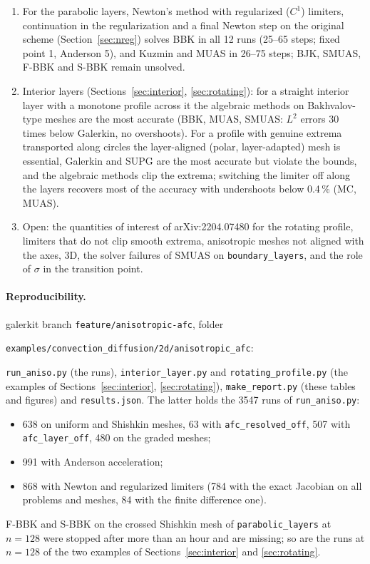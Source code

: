 \documentclass[11pt]{article}
\begin{document}
\begin{enumerate}[leftmargin=*]
  Kuzmin or MUAS.
\item For the parabolic layers, Newton's method with regularized ($C^1$) limiters, continuation in the regularization
  and a final Newton step on the original scheme (Section~\ref{sec:nreg}) solves BBK in all 12 runs (25--65 steps; fixed
  point 1, Anderson 5), and Kuzmin and MUAS in 26--75 steps; BJK, SMUAS, F-BBK and S-BBK remain unsolved.
\item Interior layers (Sections~\ref{sec:interior}, \ref{sec:rotating}): for a straight interior layer with a monotone
  profile across it the algebraic methods on Bakhvalov-type meshes are the most accurate (BBK, MUAS, SMUAS: $L^2$
  errors 30 times below Galerkin, no overshoots). For a profile with genuine extrema transported along circles the
  layer-aligned (polar, layer-adapted) mesh is essential, Galerkin and SUPG are the most accurate but violate the
  bounds, and the algebraic methods clip the extrema; switching the limiter off along the layers recovers most of the
  accuracy with undershoots below 0.4\,\% (MC, MUAS).
\item Open: the quantities of interest of arXiv:2204.07480 for the rotating profile, limiters that do not clip smooth
  extrema, anisotropic meshes not aligned with the axes, 3D, the solver failures of SMUAS on
  \texttt{boundary\_layers}, and the role of $\sigma$ in the transition point.
\end{enumerate}

\paragraph{Reproducibility.} galerkit branch \texttt{feature/anisotropic-afc}, folder
\begin{center}\texttt{examples/convection\_diffusion/2d/anisotropic\_afc}:\end{center}
\texttt{run\_aniso.py} (the runs), \texttt{interior\_layer.py} and \texttt{rotating\_profile.py} (the examples of
Sections~\ref{sec:interior}, \ref{sec:rotating}), \texttt{make\_report.py} (these tables and figures) and
\texttt{results.json}. The latter holds the 3547 runs of \texttt{run\_aniso.py}:
\begin{itemize}[leftmargin=*,nosep]
\item 638 on uniform and Shishkin meshes, 63 with \texttt{afc\_resolved\_off}, 507 with \texttt{afc\_layer\_off},
  480 on the graded meshes;
\item 991 with Anderson acceleration;
\item 868 with Newton and regularized limiters (784 with the exact Jacobian on all problems and meshes, 84 with the
  finite difference one).
\end{itemize}
F-BBK and S-BBK on the crossed Shishkin mesh of \texttt{parabolic\_layers} at $n=128$ were stopped after more than an
hour and are missing; so are the runs at $n=128$ of the two examples of Sections~\ref{sec:interior} and
\ref{sec:rotating}.
\end{document}

